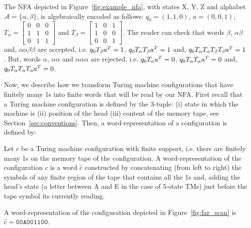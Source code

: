 \begin{example}\label{ex:nfa}\normalfont
  The NFA depicted in Figure~\ref{fig:example_nfa}, with states X, Y, Z and alphabet $\mathcal{A}=\{\alpha,\beta\}$, is algebraically encoded as follows: $q_0 = (1,1,0)$, $a=(0,0,1)$, $T_\alpha=\begin{bmatrix}
      0 & 0 & 0 \\
      1 & 1 & 0 \\
      0 & 1 & 1
    \end{bmatrix}$ and $T_\beta= \begin{bmatrix}
      1 & 0 & 1 \\
      1 & 0 & 0 \\
      0 & 0 & 1
    \end{bmatrix}$. The reader can check that words $\beta$, $\alpha\beta$ and, $\alpha\alpha\beta\beta$ are accepted, i.e. $q_0T_\beta a^T = 1$, $q_0T_\alpha T_\beta a^T = 1$ and, $q_0T_\alpha T_\alpha T_\beta T_\beta a ^T = 1$. But, words $\alpha$, $\alpha\alpha$ and $\alpha\alpha\alpha$ are rejected, i.e. $q_0T_\alpha a^T = 0$, $q_0T_\alpha T_\alpha a^T = 0$ and, $q_0T_\alpha T_\alpha T_\alpha a ^T = 0$.
\end{example}


Now, we describe how we transform Turing machine configurations that have finitely many 1s into finite words that will be read by our NFA. First recall that a Turing machine configuration is defined by the 3-tuple: (i) state in which the machine is (ii) position of the head (iii) content of the memory tape, see Section~\ref{sec:conventions}. Then, a word-representation of a configuration is defined by:

\begin{definition}\label{def:wordc}\normalfont
  Let $c$ be a Turing machine configuration with finite support, i.e. there are finitely many 1s on the memory tape of the configuration. A word-representation of the configuration $c$ is a word $\hat{c}$ constructed by concatenating (from left to right) the symbols of any finite region of the tape that contains all the 1s and, adding the head's state (a letter between A and E in the case of 5-state TMs) just before the tape symbol its currently reading.
\end{definition}

\begin{example}\normalfont
  A word-representation of the configuration depicted in Figure~\ref{fig:far_scan} is $\hat{c} = \texttt{00A001100}$.
\end{example}

